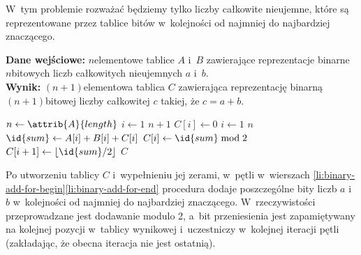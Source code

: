 \exercise %
W~tym problemie rozważać będziemy tylko liczby całkowite nieujemne, które są reprezentowane przez tablice bitów w~kolejności od najmniej do najbardziej znaczącego.

\bigskip
\noindent\textbf{Dane wejściowe:} $n$\nbhyphen elementowe tablice $A$ i~$B$ zawierające reprezentacje binarne $n$\nbhyphen bitowych liczb całkowitych nieujemnych $a$ i~$b$.\\
\textbf{Wynik:} $(n+1)$\nbhyphen elementowa tablica $C$ zawierająca reprezentację binarną $(n+1)$\nbhyphen bitowej liczby całkowitej $c$ takiej, że $c=a+b$.

\begin{codebox}
\li	$n\gets\attrib{A}{length}$
\li	\For $i\gets1$ \To $n+1$
\li		\Do $C[i]\gets0$
		\End
\li	\For $i\gets1$ \To $n$ \label{li:binary-add-for-begin}
\li		\Do $\id{sum}\gets A[i]+B[i]+C[i]$
\li			$C[i]\gets\id{sum}\bmod2$
\li			$C[i+1]\gets\lfloor\id{sum}/2\rfloor$
		\End \label{li:binary-add-for-end}
\li	\Return $C$
\end{codebox}

Po utworzeniu tablicy $C$ i~wypełnieniu jej zerami, w~pętli  w~wierszach \ref{li:binary-add-for-begin}\nbendash\ref{li:binary-add-for-end} procedura dodaje poszczególne bity liczb $a$ i~$b$ w~kolejności od najmniej do najbardziej znaczącego.
W~rzeczywistości przeprowadzane jest dodawanie modulo 2, a~bit przeniesienia jest zapamiętywany na kolejnej pozycji w~tablicy wynikowej i~uczestniczy w~kolejnej iteracji pętli (zakładając, że obecna iteracja nie jest ostatnią).
